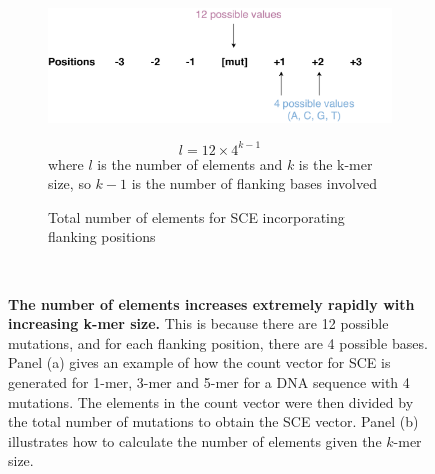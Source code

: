 \begin{figure}[ht!]
  \vspace{1cm}
  \begin{subfigure}{\textwidth}
  \begin{minipage}{0.65\textwidth}
    \includegraphics[width=\textwidth]{graphics/sce_counts_demo.pdf}
  \end{minipage}
  \begin{minipage}{0.3\textwidth}
    \begin{equation}
    l = 12 \times 4^{k-1}
    \label{eq:sce_counts}
    \end{equation}
    where $l$ is the number of elements and $k$ is the k-mer size, so $k-1$ is the number of flanking bases involved
  \end{minipage}
    \caption{Total number of elements for SCE incorporating flanking positions}\label{fig:sce_size}
  \end{subfigure} \\
  \vspace{0.2cm}
  \caption{
  \textbf{The number of elements increases extremely rapidly with increasing k-mer size.} This is because there are 12 possible mutations, and for each flanking position, there are 4 possible bases. Panel (a) gives an example of how the count vector for SCE is generated for 1-mer, 3-mer and 5-mer for a DNA sequence with 4 mutations. The elements in the count vector were then divided by the total number of mutations to obtain the SCE vector. Panel (b) illustrates how to calculate the number of elements given the $k$-mer size. 
} \label{fig:sce_counts}
\end{figure}
